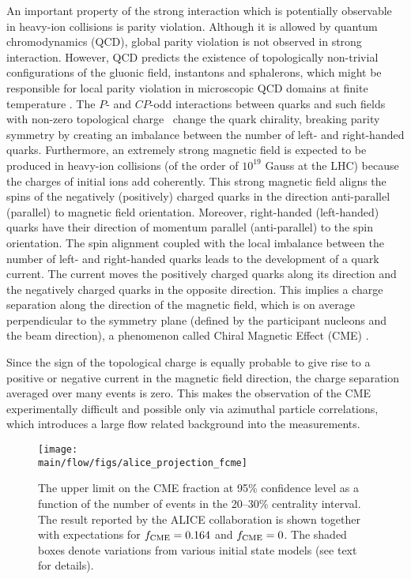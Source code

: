 An important property of the strong interaction which is potentially observable in heavy-ion collisions is parity violation. Although it is allowed by 
quantum chromodynamics (QCD), global parity violation is not observed in strong interaction. However, QCD predicts the existence of topologically 
non-trivial configurations of the gluonic field, instantons and sphalerons, which might be responsible for local parity violation in microscopic QCD 
domains at finite temperature \cite{Lee:1973iz, Lee:1974ma, Morley:1983wr, Kharzeev:1998kz}. The $P$- and $CP$-odd interactions between quarks 
and such fields with non-zero topological charge~\cite{Chern:1974ft} change the quark chirality, breaking parity symmetry by creating an imbalance 
between the number of left- and right-handed quarks. Furthermore, an extremely strong magnetic field is expected to be produced in heavy-ion collisions 
\cite{Deng:2012pc, Gursoy:2014aka} (of the order of $10^{19}$ Gauss at the LHC) because the charges of initial ions add coherently. This strong 
magnetic field aligns the spins of the negatively (positively) charged quarks in the direction anti-parallel (parallel) to magnetic field orientation. Moreover, 
right-handed (left-handed) quarks have their direction of momentum parallel (anti-parallel) to the spin orientation. The spin alignment coupled with the 
local imbalance between the number of left- and right-handed quarks leads to the development of a quark current. The current moves the positively 
charged quarks along its direction and the negatively charged quarks in the opposite direction. This implies a charge separation along the direction 
of the magnetic field, which is on average perpendicular to the symmetry plane (defined by the participant nucleons and the beam direction), a 
phenomenon called Chiral Magnetic Effect (CME) \cite{Kharzeev:2004ey, Kharzeev:2007tn, Kharzeev:2007jp, Fukushima:2008xe}. 

Since the sign of 
the topological charge is equally probable to give rise to a positive or negative current in the magnetic field direction, the charge separation averaged 
over many events is zero. This makes the observation of the CME experimentally difficult and possible only via azimuthal particle correlations, which 
introduces a large flow related background into the measurements.

\begin{figure}[!ht]
\begin{center}
\texttt{[image: \\main/flow/figs/alice\_projection\_fcme]}
\caption{The upper limit on the CME fraction at 95\% confidence level as a function of the number of events in the 20--30\% centrality interval. The result reported by the ALICE collaboration \cite{Acharya:2017fau} is shown together with expectations for $f_{\rm CME}=0.164$ and $f_{\rm CME}=0$. The shaded boxes denote variations from various initial state models (see text for details).}
\label{fig:alice_fcme}
\end{center}
\end{figure}

